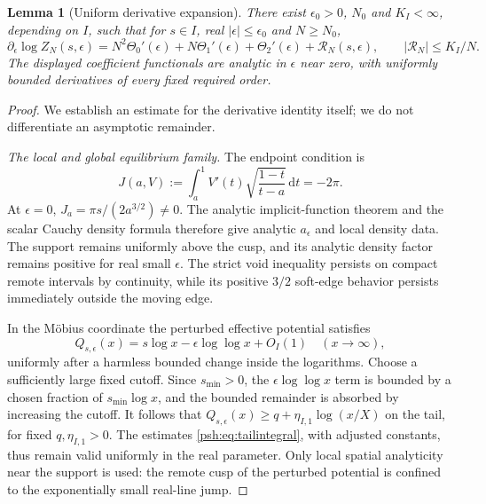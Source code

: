 \documentclass[11pt,a4paper]{article}
\numberwithin{equation}{section}
\newtheorem{lemma}[theorem]{Lemma}
\theoremstyle{remark}\newtheorem{remark}[theorem]{Remark}
\newcommand{\dd}{\,\mathrm d}
\begin{document}
\begin{lemma}[Uniform derivative expansion]\label{psh:lem:derivative}
There exist $\epsilon_0>0$, $N_0$ and $K_I<\infty$, depending on $I$, such
that for $s\in I$, real $|\epsilon|\leq\epsilon_0$ and $N\geq N_0$,
\begin{equation}\label{psh:eq:derivativelemma}
 \partial_\epsilon\log Z_N(s,\epsilon)
 =N^2\Theta_0'(\epsilon)+N\Theta_1'(\epsilon)+\Theta_2'(\epsilon)
        +\mathcal R_N(s,\epsilon),\qquad
 |\mathcal R_N|\leq K_I/N.
\end{equation}
The displayed coefficient functionals are analytic in $\epsilon$ near
zero, with uniformly bounded derivatives of every fixed required order.
\end{lemma}
\begin{proof}
We establish an estimate for the derivative identity itself; we do not
differentiate an asymptotic remainder.

\textit{The local and global equilibrium family.}
The endpoint condition is
\begin{equation}\label{psh:eq:J}
 J(a,V):=\int_a^1 V'(t)\sqrt{\frac{1-t}{t-a}}\dd t=-2\pi.
\end{equation}
At $\epsilon=0$, $J_a=\pi s/(2a^{3/2})\ne0$.
The analytic implicit-function theorem and the scalar Cauchy density
formula therefore give analytic $a_\epsilon$ and local density data.
The support remains uniformly above the cusp, and its analytic density
factor remains positive for real small $\epsilon$. The strict void
inequality persists on compact remote intervals by continuity, while
its positive $3/2$ soft-edge behavior persists immediately outside the
moving edge.

In the M\"obius coordinate the perturbed effective potential satisfies
\[
 Q_{s,\epsilon}(x)=s\log x-\epsilon\log\log x+O_I(1)
 \quad(x\to\infty),
\]
uniformly after a harmless bounded change inside the logarithms.
Choose a sufficiently large fixed cutoff. Since $s_{\min}>0$, the
$\epsilon\log\log x$ term is bounded by a chosen fraction of
$s_{\min}\log x$, and the bounded remainder is absorbed by increasing
the cutoff. It follows that
$Q_{s,\epsilon}(x)\geq q+\eta_{I,1}\log(x/X)$ on the tail, for fixed
$q,\eta_{I,1}>0$. The estimates \eqref{psh:eq:tailintegral}, with adjusted
constants, thus remain valid uniformly in the real parameter.
Only local spatial analyticity near the support is used: the remote
cusp of the perturbed potential is confined to the exponentially small
real-line jump.


\end{proof}
\end{document}
